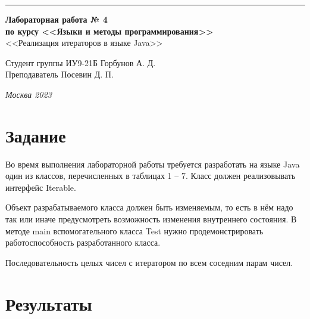 \documentclass[a4paper, 14pt]{extarticle}
\begin{document}
\begin{titlepage}
\vspace*{-16pt}
\hspace{30pt}\rule{0.866\textwidth}{0.4pt}
  
\vspace{11em}

\begin{center}
\Large {\bf Лабораторная работа № 4} \\ 
\large {\bf по курсу <<Языки и методы программирования>>} \\
\large <<Реализация итераторов в языке Java>> 
\end{center}\normalsize

\vspace{8em}


\begin{flushright}
  {Студент группы ИУ9-21Б Горбунов А. Д. \hspace*{15pt}\\ 
  \vspace{2ex}
  Преподаватель Посевин Д. П.\hspace*{15pt}}
\end{flushright}

\bigskip

\vfill
 

\begin{center}
\textsl{Москва 2023}
\end{center}
\end{titlepage}

\renewcommand{\ttdefault}{pcr}

\setlength{\tabcolsep}{3pt}
\newpage
\setcounter{page}{2}

\section{Задание}\label{Sect::task}
Во время выполнения лабораторной работы требуется разработать на языке Java один из классов, перечисленных в таблицах 1 – 7. Класс должен реализовывать интерфейс Iterable.

Объект разрабатываемого класса должен быть изменяемым, то есть в нём надо так или иначе предусмотреть возможность изменения внутреннего состояния.
В методе main вспомогательного класса Test нужно продемонстрировать работоспособность разработанного класса.

Последовательность целых чисел с итератором по
всем соседним парам чисел.
\section{Результаты}\label{Sect::res}
\end{document}
